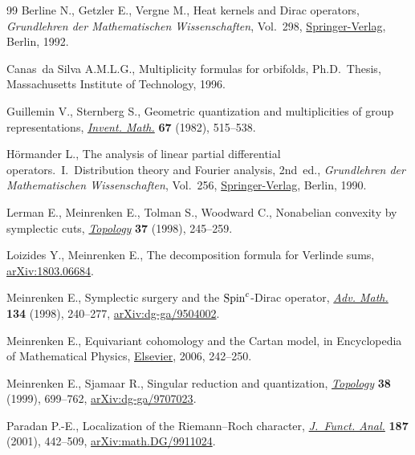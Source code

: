 \documentclass[11pt]{article}
\numberwithin{equation}{section}
\begin{document}
\begin{thebibliography}{99}
Berline N., Getzler E., Vergne M., Heat kernels and {D}irac operators,
 \textit{Grundlehren der Mathematischen Wissenschaften}, Vol.~298,
 \href{https://doi.org/10.1007/978-3-642-58088-8}{Springer-Verlag}, Berlin, 1992.

Canas~da Silva A.M.L.G., Multiplicity formulas for orbifolds, Ph.D.~Thesis,
 {M}assachusetts Institute of Technology, 1996.

Guillemin V., Sternberg S., Geometric quantization and multiplicities of group
 representations, \href{https://doi.org/10.1007/BF01398934}{\textit{Invent. Math.}} \textbf{67} (1982), 515--538.

H\"{o}rmander L., The analysis of linear partial differential
 operators.~{I}.~Distribution theory and Fourier ana\-ly\-sis, 2nd~ed., \textit{Grundlehren
 der Mathematischen Wissenschaften}, Vol.~256, \href{https://doi.org/10.1007/978-3-642-61497-2}{Springer-Verlag},
 Berlin, 1990.

Lerman E., Meinrenken E., Tolman S., Woodward C., Nonabelian convexity by
 symplectic cuts, \href{https://doi.org/10.1016/S0040-9383(97)00030-X}{\textit{Topology}} \textbf{37} (1998), 245--259.

Loizides Y., Meinrenken E., The decomposition formula for {V}erlinde sums,
 \href{https://arxiv.org/abs/1803.06684}{arXiv:1803.06684}.

Meinrenken E., Symplectic surgery and the {${\rm Spin}^c$}-{D}irac operator,
 \href{https://doi.org/10.1006/aima.1997.1701}{\textit{Adv. Math.}} \textbf{134} (1998), 240--277, \href{https://arxiv.org/abs/dg-ga/9504002}{arXiv:dg-ga/9504002}.

Meinrenken E., Equivariant cohomology and the {C}artan model, in Encyclopedia
 of Mathematical Physics, \href{https://doi.org/10.1016/b0-12-512666-2/00344-8}{Elsevier}, 2006, 242--250.

Meinrenken E., Sjamaar R., Singular reduction and quantization,
 \href{https://doi.org/10.1016/S0040-9383(98)00012-3}{\textit{Topology}} \textbf{38} (1999), 699--762, \href{https://arxiv.org/abs/dg-ga/9707023}{arXiv:dg-ga/9707023}.

Paradan P.-E., Localization of the {R}iemann--{R}och character,
 \href{https://doi.org/10.1006/jfan.2001.3825}{\textit{J.~Funct. Anal.}} \textbf{187} (2001), 442--509,
 \href{https://arxiv.org/abs/math.DG/9911024}{arXiv:math.DG/9911024}.


\end{thebibliography}
\end{document}
